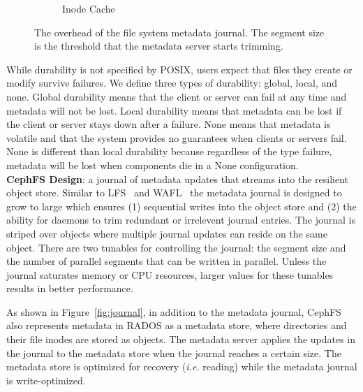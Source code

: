 \begin{figure}[t]
\begin{subfigure}[b]{.3\linewidth}
      \caption{Inode Cache}
      \label{fig:slowdown-journal-c}
  \end{subfigure}
  \caption{The overhead of the file system metadata journal. The segment size
  is the threshold that the metadata server starts
  trimming.\label{fig:slowdown-journal}}
\end{figure}

While durability is not specified by POSIX, users expect that files they create
or modify survive failures.  We define three types of durability: global,
local, and none.  Global
durability means that the client or server can fail at any time and metadata
will not be lost. Local durability means that metadata can be lost if the
client or server stays down after a failure. None means that metadata is volatile
and that the system provides no guarantees when clients or servers fail. 
None is different than local durability because regardless of the type failure,
metadata will be lost when components die in a None configuration.\\

\noindent\textbf{CephFS Design}: a journal of metadata updates that streams into
the resilient object store. Similar to LFS~\cite{rosenblum:acm1992-LFS} and
WAFL~\cite{hitz:wtec1994-WAFL} the metadata journal is designed to grow to large which
ensures (1) sequential writes into the object store and (2) the ability for daemons to
trim redundant or irrelevent journal entries.  The journal is striped over
objects where multiple journal updates can reside on the same object. There are
two tunables for controlling the journal: the segment size and the number of
parallel segments that can be written in parallel. Unless the journal saturates 
memory or CPU resources, larger values for these tunables results in better
performance.

As shown in Figure~\ref{fig:journal}, in addition to the metadata journal,
CephFS also represents metadata in RADOS as a metadata store, where directories
and their file inodes are stored as objects.  The metadata server applies the
updates in the journal to the metadata store when the journal reaches a certain
size. The metadata store is optimized for recovery ({\it i.e.} reading) while
the metadata journal is write-optimized.

